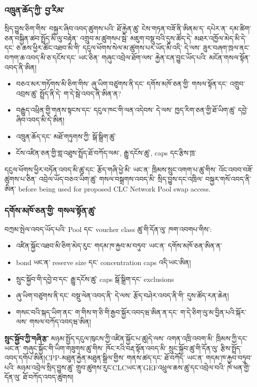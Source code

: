 \documentclass[11pt]{article}
\begin{document}
\subsubsection*{འཁྲུན་ཆོད་ཀྱི་ བྱ་རིམ་}

སྲིད་བྱུས་ཅིག་གིས་ བསྐྱར་ཞིབ་འབད་ཚུགས་པའི་ ཐོ་རྐྱེན་ཚུ་ ངེས་གཏན་བཟོ་ནི་ཨིནམ་ད་ དཔེར་ན་ དམ་ཚིག་ཅན་བསྐྱིན་ཚབ་སྤྲོད་མི་ལུ་བརྟེན་ འགྲུབ་མ་ཚུགསཔ་སྦེ་ མཇུག་བསྡུ་བའི་དུས་ཚོད་དེ་ མཐར་འཁྱོལ་མེད་མི་དེ་དང་ ཅ་ཆས་ཕྱིར་ཚོང་འཐབ་མི་གི་ དངུལ་ཕོགས་སེལ་མ་ཚུགས་པར་ཡོད་མི་འདི་ དེ་ལས་ ཟུར་བཞག་ཁྲལ་ནང་ བཀག་ཆ་འབད་མི་ཅ་དངོས་དང་ ཡང་ཅིན་ གཞུང་འབྲེལ་ཐོག་ལས་ རྐྱེན་ངན་བྱུང་ཡོད་པའི་ མངོན་གསལ་སྟོན་འབད་ནི་ཨིན།

\begin{itemize}[leftmargin=*]
\item བཅའ་མར་གཏོགས་མི་ཅིག་གིས་ ཞུ་ཡིག་བཙུགས་ནི་དང་ དགོས་མཁོ་ཅན་གྱི་ གསལ་སྟོན་དང་ འགྲུབ་འབྲས་ཚུ་ སྤྲོད་ནི་དེ་ ག་དེ་སྦེ་འབད་ནི་ཨིན་ན?
\item བརྒྱུད་འཕྲིན་གྱི་གནས་སྟངས་དང་ དངུལ་ཁང་གི་ལན་འདེབས་ དེ་ལས་ ཁྱད་རིག་ཅན་གྱི་ཐོ་ཡིག་ཚུ་ དབྱེ་ཞིབ་འབད་མི་དེ་ཨིན།
\item འཁྲུན་ཆོད་དང་ མཐོ་གཏུགས་ཀྱི་ སྒོ་སྒྲིག་ཚུ་
\item ངོས་འཛིན་ཅན་གྱི་གླ་འཐུས་སྤྲོད་ཐོ་བཀོད་ལམ་, རྒྱུ་དངོས་ཚུ་, caps དང་རྩིས་ཁྲ་
\end{itemize}
དངུལ་ཕོགས་ཕྱིར་བཏོན་འབད་མི་ཚུ་དང་ རྩོད་གཞི་ཕྱེ་མི་ ཡང་ན་ ཁྲིམས་སྲུང་འགག་པ་ཚུ་གིས་ འོང་འབབ་བཟོ་ཚུགས་པ་ཅིན་ འབྲེལ་ཡོད་བཅའ་ཡིག་ཚུ་ གསལ་བསྒྲགས་འབད་མི་ སྲིད་བྱུས་དང་འཁྲིལ་ བསྐྱར་གསོ་འབད་ནི་ཨིན་ before being used for proposed CLC Network Pool swap access.

\subsubsection*{དགོས་མཁོ་ཅན་གྱི་ གསལ་སྟོན་ཚུ་}

བཀྲམ་སྤེལ་འབད་ཡོད་པའི་ Pool དང་ voucher class ཚུ་གི་དོན་ལུ་ ཁག་འབགཔ་གིས་:

\begin{itemize}[leftmargin=*]
\item འཛིན་སྐྱོང་འཐབ་མི་ཅིག་མེད་རུང་ གདམ་ཁ་རྐྱབ་མ་བཏུབ་ ཡང་ན་ དགོས་མཁོ་ཅན་ཨིན་ན་
\item bond ཡང་ན་ reserve size དང་ concentration caps འདི་ཡང་ཨིན།
\item སྲུང་སྐྱོབ་གི་དབྱེ་བ་དང་ རྒྱུ་དངོས་ཚུ་ caps སྒོ་སྒྲིག་དང་ exclusions
\item ཞུ་ཡིག་བཙུགས་ནི་དང་ བསྡུ་ལེན་འབད་ནི་ དེ་ལས་ རྩོད་བཤེར་འབད་ནི་གི་ དུས་ཚོད་རན་ཆེན།
\item གསང་བའི་སྐད་ཡིག་ནང་ ག་གིས་ག་ཅི་གི་རྒྱབ་སྐྱོར་འབདཝ་ཨིན་ན་དང་ ག་དེ་ཅིག་ལུ་མ་བྱིན་པའི་སྐོར་ལས་ གསལ་བཀོད་འབདཝ་ཨིན།
\end{itemize}
\textbf{སྲུང་སྐྱོབ་ཀྱི་གཞི་རྩ་} མཉམ་སྤྱོད་དངུལ་ཁུངས་ཀྱི་འཛིན་སྐྱོང་པ་ཚུ།དེ་ལས་ འགན་འཁྲི་འབག་མི་ ཁྲིམས་ཀྱི་དང་ ཡང་ན་ གཞུང་སྐྱོང་གི་ཡིག་གཟུགས་ཚུ་གིས་ ཁོང་རའི་བརྡ་སྟོན་འབད་མི་ སྲུང་སྐྱོབ་ཚུ་གི་དོན་ལུ་ རྩིས་སྤྲོད་འབད་དགོཔ་ཨིན།CPP-མཐུན་རྐྱེན་མཐུན་སྒྲིལ་གྱིས་ གནས་ཚད་དང་ ཐོ་བཀོད་ ཡང་ན་ གདམ་ཁ་རྐྱབ་བཏུབ་པའི་ མཉམ་འབྲེལ་སྲིད་བྱུས་ཚུ་ གྲུབ་ཚུགས་རུང་CLCཡང་ན་GEFའཕྲུལ་ཆས་ཚུ་དང་འབྲེལ་བའི་ ཁེ་ཕན་གྱི་དོན་ལུ་ ཐོ་བཀོད་འབད་ཚུགས།
\end{document}
